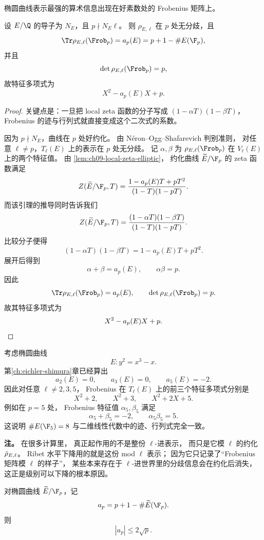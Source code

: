 椭圆曲线表示最强的算术信息出现在好素数处的 Frobenius 矩阵上。

\begin{theorem}
\label{thm:ch09-frob-charpoly-elliptic}
设 $E/\Q$ 的导子为 $N_E$，且 $p\nmid N_E\ell$。
则 $\rho_{E,\ell}$ 在 $p$ 处无分歧，且
\[
  \Tr\rho_{E,\ell}(\Frob_p)=a_p(E)=p+1-\#E(\F_p),
\]
并且
\[
  \det\rho_{E,\ell}(\Frob_p)=p,
\]
故特征多项式为
\[
  X^2-a_p(E)X+p.
\]
\end{theorem}

\begin{proof}
关键点是：一旦把 local zeta 函数的分子写成 $(1-\alpha T)(1-\beta T)$，
Frobenius 的迹与行列式就直接变成这个二次式的系数。

因为 $p\nmid N_E$，曲线在 $p$ 处好约化。
由 N\'eron--Ogg--Shafarevich 判别准则，
对任意 $\ell\neq p$，$T_\ell(E)$ 上的表示在 $p$ 处无分歧。
记 $\alpha,\beta$ 为 $\rho_{E,\ell}(\Frob_p)$ 在 $V_\ell(E)$ 上的两个特征值。
由 \cref{lem:ch09-local-zeta-elliptic}，
约化曲线 $\widetilde E/\F_p$ 的 zeta 函数满足
\[
  Z(\widetilde E/\F_p,T)=\frac{1-a_p(E)T+pT^2}{(1-T)(1-pT)}.
\]
而该引理的推导同时告诉我们
\[
  Z(\widetilde E/\F_p,T)=\frac{(1-\alpha T)(1-\beta T)}{(1-T)(1-pT)}.
\]
比较分子便得
\[
  (1-\alpha T)(1-\beta T)=1-a_p(E)T+pT^2.
\]
展开后得到
\[
  \alpha+\beta=a_p(E),
  \qquad
  \alpha\beta=p.
\]
因此
\[
  \Tr\rho_{E,\ell}(\Frob_p)=a_p(E),
  \qquad
  \det\rho_{E,\ell}(\Frob_p)=p.
\]
故其特征多项式为
\[
  X^2-a_p(E)X+p. \qedhere
\]
\end{proof}

\begin{example}[曲线 $E:y^2=x^3-x$]
\label{ex:ch09-curve-x3-minus-x}
考虑椭圆曲线
\[
  E\colon y^2=x^3-x.
\]
第\ref{ch:eichler-shimura}章已经算出
\[
  a_2(E)=0,
  \qquad a_3(E)=0,
  \qquad a_5(E)=-2.
\]
因此对任意 $\ell\neq 2,3,5$，
Frobenius 在 $T_\ell(E)$ 上的前三个特征多项式分别是
\[
  X^2+2,
  \qquad X^2+3,
  \qquad X^2+2X+5.
\]
例如在 $p=5$ 处，
Frobenius 特征值 $\alpha_5,\beta_5$ 满足
\[
  \alpha_5+\beta_5=-2,
  \qquad \alpha_5\beta_5=5.
\]
这说明 $\#E(\F_5)=8$ 与二维线性代数中的迹、行列式完全一致。
\end{example}

\textbf{注。}
在很多计算里，
真正起作用的不是整份 $\ell$-进表示，
而只是它模 $\ell$ 的约化 $\bar{\rho}_{E,\ell}$。
Ribet 水平下降用的就是这份 mod $\ell$ 表示；
因为它只记录了“Frobenius 矩阵模 $\ell$ 的样子”，
某些本来存在于 $\ell$-进世界里的分歧信息会在约化后消失，
这正是级别可以下降的根本原因。

\begin{lemma}
\label{lem:ch09-hasse-elementary}
对椭圆曲线 $\widetilde E/\F_p$，记
\[
  a_p=p+1-\#\widetilde E(\F_p).
\]
则
\[
  |a_p|\le 2\sqrt p.
\]
\end{lemma}

